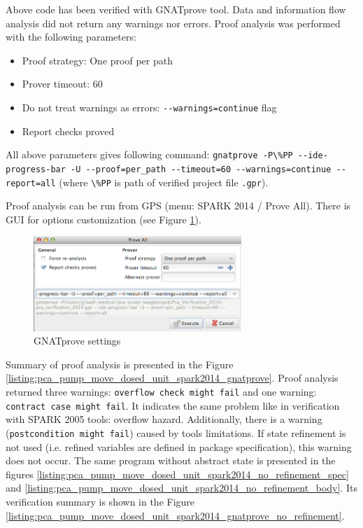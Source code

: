 Above code has been verified with GNATprove tool. Data and information flow analysis did not return any warnings nor errors. Proof analysis was performed with the following parameters:
\begin{itemize}
    \item Proof strategy: One proof per path
    \item Prover timeout: 60
    \item Do not treat warnings as errors: \lstinline{--warnings=continue} flag
    \item Report checks proved
\end{itemize}

All above parameters gives following command: \lstinline{gnatprove -P\%PP --ide-progress-bar -U --proof=per_path --timeout=60 --warnings=continue --report=all} (where \lstinline{\%PP} is path of verified project file \lstinline{.gpr}).

Proof analysis can be run from GPS (menu: SPARK 2014 / Prove All). There is GUI for options customization (see Figure \ref{figure:gnatprove-settings}).

\begin{figure}[ht]%
    \begin{center}
        \includegraphics[width=0.7\textwidth]{figures/gnatprove-settings.png}        
    \end{center}
    \caption{GNATprove settings}
    \label{figure:gnatprove-settings}
\end{figure}

Summary of proof analysis is presented in the Figure \ref{listing:pca_pump_move_dosed_unit_spark2014_gnatprove}. Proof analysis returned three warnings: \lstinline{overflow check might fail} and one warning: \lstinline{contract case might fail}. It indicates the same problem like in verification with SPARK 2005 tools: overflow hazard. Additionally, there is a warning (\lstinline{postcondition might fail}) caused by tools limitations. If state refinement is not used (i.e. refined variables are defined in package specification), this warning does not occur. The same program without abstract state is presented in the figures \ref{listing:pca_pump_move_dosed_unit_spark2014_no_refinement_spec} and \ref{listing:pca_pump_move_dosed_unit_spark2014_no_refinement_body}. Its verification summary is shown in the Figure \ref{listing:pca_pump_move_dosed_unit_spark2014_gnatprove_no_refinement}. 

